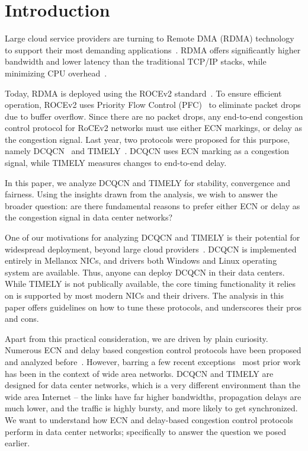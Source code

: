\section{Introduction}

Large cloud service providers are turning to Remote DMA (RDMA) technology to
support their most demanding applications~\cite{dcqcn,timely,tcp-bolt}.  RDMA
offers significantly higher bandwidth and lower latency than the traditional
TCP/IP stacks, while minimizing CPU overhead~\cite{dcqcn,farm,timely}. 

Today, RDMA is deployed using the ROCEv2 standard~\cite{rocev2}. To ensure
efficient operation, ROCEv2 uses Priority Flow Control (PFC)~\cite{pfc} to
eliminate packet drops due to buffer overflow.  Since there are no packet drops,
any end-to-end congestion control protocol for RoCEv2 networks must use either
ECN markings, or delay as the congestion signal.  Last year, two protocols were
proposed for this purpose, namely DCQCN~\cite{dcqcn} and TIMELY~\cite{timely}.
DCQCN uses ECN marking as a congestion signal, while TIMELY measures changes to
end-to-end delay.


In this paper, we analyze DCQCN and TIMELY for stability, convergence and
fairness. Using the insights drawn from the analysis, we wish to answer the
broader question: are there fundamental reasons to prefer either ECN or delay as
the congestion signal in data center networks?


One of our motivations for analyzing DCQCN and TIMELY is their potential for
widespread deployment, beyond large cloud providers~\cite{dcqcn, timely}.  DCQCN
is implemented entirely in Mellanox NICs, and drivers both Windows and Linux
operating system are available. Thus, anyone can deploy DCQCN in their data
centers. While TIMELY is not publically available, the core timing functionality
it relies on is supported by most modern NICs and their drivers. The analysis in
this paper offers guidelines on how to tune these protocols, and underscores
their pros and cons.

Apart from this practical consideration, we are driven by plain curiosity.
Numerous ECN and delay based congestion control protocols have been proposed and
analyzed before~\cite{ecn,
tcp-vegas,misra2000fluid,hollot2001designing,misra:TAC2002,gorinsky2004feedback}.
However, barring a few recent exceptions~\cite{dctcp-analysis, qcn-analysis}
most prior work has been in the context of wide area networks. DCQCN and TIMELY
are designed for data center networks, which is a very different environment than
the wide area Internet -- the links have far higher bandwidths, propagation
delays are much lower, and the traffic is highly bursty, and more likely to get
synchronized.  We want to understand how ECN and delay-based congestion control
protocols perform in data center networks; specifically to answer the question
we posed earlier.

